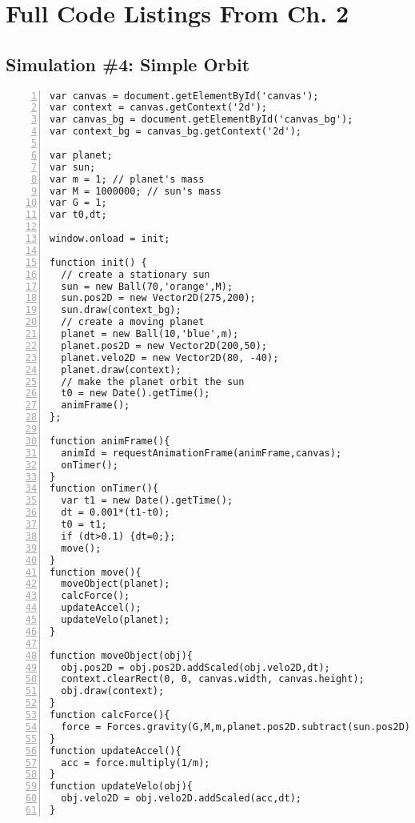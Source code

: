 
\chapter{Full Code Listings From Ch. 2} %

\label{AppendixB} %


\section{Simulation \#4:  Simple Orbit}

\begin{lstlisting}[breaklines=true, frame=single, numbers=left, caption=Simple Orbit Simulation, label=lst:orbit]
var canvas = document.getElementById('canvas');
var context = canvas.getContext('2d'); 
var canvas_bg = document.getElementById('canvas_bg');
var context_bg = canvas_bg.getContext('2d');

var planet;
var sun;
var m = 1; // planet's mass
var M = 1000000; // sun's mass
var G = 1;
var t0,dt;

window.onload = init; 

function init() {
  // create a stationary sun
  sun = new Ball(70,'orange',M);
  sun.pos2D = new Vector2D(275,200);  
  sun.draw(context_bg);
  // create a moving planet     
  planet = new Ball(10,'blue',m);
  planet.pos2D = new Vector2D(200,50);
  planet.velo2D = new Vector2D(80, -40);
  planet.draw(context);
  // make the planet orbit the sun
  t0 = new Date().getTime(); 
  animFrame();
};

function animFrame(){
  animId = requestAnimationFrame(animFrame,canvas);
  onTimer(); 
}
function onTimer(){
  var t1 = new Date().getTime(); 
  dt = 0.001*(t1-t0); 
  t0 = t1;  
  if (dt>0.1) {dt=0;};  
  move();
}
function move(){      
  moveObject(planet);
  calcForce();
  updateAccel();
  updateVelo(planet);
}

function moveObject(obj){
  obj.pos2D = obj.pos2D.addScaled(obj.velo2D,dt); 
  context.clearRect(0, 0, canvas.width, canvas.height);
  obj.draw(context);  
}
function calcForce(){
  force = Forces.gravity(G,M,m,planet.pos2D.subtract(sun.pos2D)); 
} 
function updateAccel(){
  acc = force.multiply(1/m);
} 
function updateVelo(obj){
  obj.velo2D = obj.velo2D.addScaled(acc,dt);        
}
\end{lstlisting}



